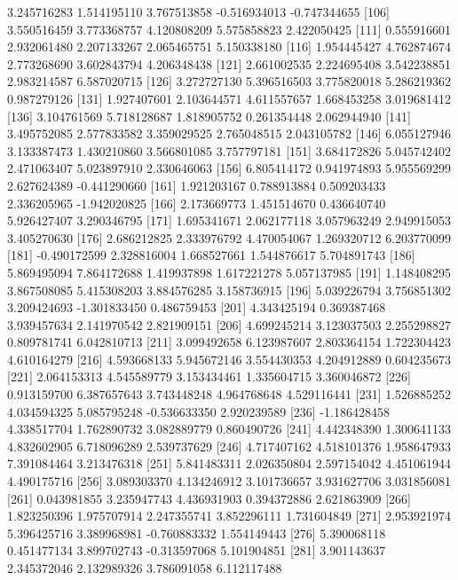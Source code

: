 \documentclass[12pt]{article}
\begin{document}
\begin{Schunk}
\begin{Soutput}
 [101]  3.245716283  1.514195110  3.767513858 -0.516934013 -0.747344655
 [106]  3.550516459  3.773368757  4.120808209  5.575858823  2.422050425
 [111]  0.555916601  2.932061480  2.207133267  2.065465751  5.150338180
 [116]  1.954445427  4.762874674  2.773268690  3.602843794  4.206348438
 [121]  2.661002535  2.224695408  3.542238851  2.983214587  6.587020715
 [126]  3.272727130  5.396516503  3.775820018  5.286219362  0.987279126
 [131]  1.927407601  2.103644571  4.611557657  1.668453258  3.019681412
 [136]  3.104761569  5.718128687  1.818905752  0.261354448  2.062944940
 [141]  3.495752085  2.577833582  3.359029525  2.765048515  2.043105782
 [146]  6.055127946  3.133387473  1.430210860  3.566801085  3.757797181
 [151]  3.684172826  5.045742402  2.471063407  5.023897910  2.330646063
 [156]  6.805414172  0.941974893  5.955569299  2.627624389 -0.441290660
 [161]  1.921203167  0.788913884  0.509203433  2.336205965 -1.942020825
 [166]  2.173669773  1.451514670  0.436640740  5.926427407  3.290346795
 [171]  1.695341671  2.062177118  3.057963249  2.949915053  3.405270630
 [176]  2.686212825  2.333976792  4.470054067  1.269320712  6.203770099
 [181] -0.490172599  2.328816004  1.668527661  1.544876617  5.704891743
 [186]  5.869495094  7.864172688  1.419937898  1.617221278  5.057137985
 [191]  1.148408295  3.867508085  5.415308203  3.884576285  3.158736915
 [196]  5.039226794  3.756851302  3.209424693 -1.301833450  0.486759453
 [201]  4.343425194  0.369387468  3.939457634  2.141970542  2.821909151
 [206]  4.699245214  3.123037503  2.255298827  0.809781741  6.042810713
 [211]  3.099492658  6.123987607  2.803364154  1.722304423  4.610164279
 [216]  4.593668133  5.945672146  3.554430353  4.204912889  0.604235673
 [221]  2.064153313  4.545589779  3.153434461  1.335604715  3.360046872
 [226]  0.913159700  6.387657643  3.743448248  4.964768648  4.529116441
 [231]  1.526885252  4.034594325  5.085795248 -0.536633350  2.920239589
 [236] -1.186428458  4.338517704  1.762890732  3.082889779  0.860490726
 [241]  4.442348390  1.300641133  4.832602905  6.718096289  2.539737629
 [246]  4.717407162  4.518101376  1.958647933  7.391084464  3.213476318
 [251]  5.841483311  2.026350804  2.597154042  4.451061944  4.490175716
 [256]  3.089303370  4.134246912  3.101736657  3.931627706  3.031856081
 [261]  0.043981855  3.235947743  4.436931903  0.394372886  2.621863909
 [266]  1.823250396  1.975707914  2.247355741  3.852296111  1.731604849
 [271]  2.953921974  5.396425716  3.389968981 -0.760883332  1.554149443
 [276]  5.390068118  0.451477134  3.899702743 -0.313597068  5.101904851
 [281]  3.901143637  2.345372046  2.132989326  3.786091058  6.112117488

\end{Soutput}
\end{Schunk}
\end{document}
